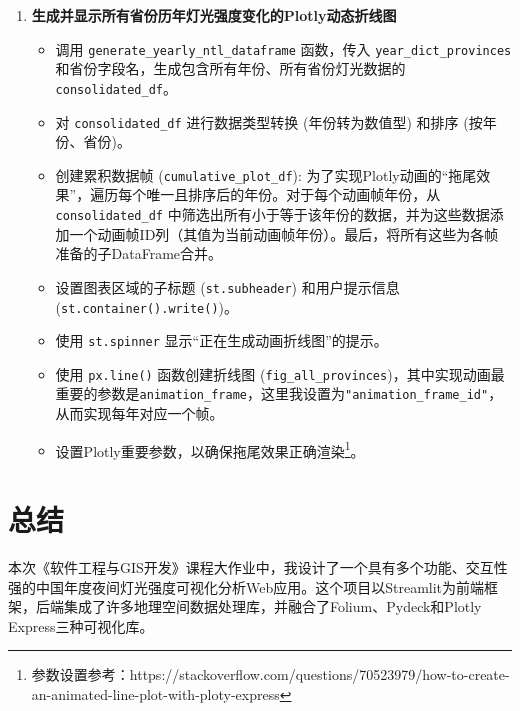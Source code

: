 \documentclass[14pt,a4paper,UTF8,twoside]{article}
\begin{document}
\begin{enumerate}
    \item \textbf{生成并显示所有省份历年灯光强度变化的Plotly动态折线图}
        \begin{itemize}
            \item 调用 \texttt{generate\_yearly\_ntl\_dataframe} 函数，传入 \texttt{year\_dict\_provinces}和省份字段名，生成包含所有年份、所有省份灯光数据的 \texttt{consolidated\_df}。
            \item 对 \texttt{consolidated\_df} 进行数据类型转换 (年份转为数值型) 和排序 (按年份、省份)。
            \item 创建累积数据帧 (\texttt{cumulative\_plot\_df}): 为了实现Plotly动画的“拖尾效果”，遍历每个唯一且排序后的年份。对于每个动画帧年份，从 \texttt{consolidated\_df} 中筛选出所有小于等于该年份的数据，并为这些数据添加一个动画帧ID列（其值为当前动画帧年份）。最后，将所有这些为各帧准备的子DataFrame合并。
            \item 设置图表区域的子标题 (\texttt{st.subheader}) 和用户提示信息 (\texttt{st.container().write()})。
            \item 使用 \texttt{st.spinner} 显示“正在生成动画折线图”的提示。
            \item 使用 \texttt{px.line()} 函数创建折线图 (\texttt{fig\_all\_provinces})，其中实现动画最重要的参数是\texttt{animation\_frame}，这里我设置为\texttt{"animation\_frame\_id"}，从而实现每年对应一个帧。
            \item 设置Plotly重要参数，以确保拖尾效果正确渲染\footnote{参数设置参考：https://stackoverflow.com/questions/70523979/how-to-create-an-animated-line-plot-with-ploty-express}。
        \end{itemize}

\end{enumerate}

\section{总结}

本次《软件工程与GIS开发》课程大作业中，我设计了一个具有多个功能、交互性强的中国年度夜间灯光强度可视化分析Web应用。这个项目以Streamlit为前端框架，后端集成了许多地理空间数据处理库，并融合了Folium、Pydeck和Plotly Express三种可视化库。
\end{document}
